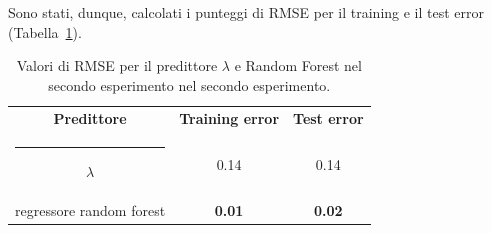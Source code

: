 \documentclass[12pt]{report}
\makeatletter
\theoremstyle{definition}
\newcommand{\thickhline}{%
    \noalign {\ifnum 0=`}\fi \hrule height 1pt
    \futurelet \reserved@a \@xhline
}
\makeatother
\begin{document}
Sono stati, dunque, calcolati i punteggi di RMSE per il training e il test error (Tabella~\ref{rmse_exp2}). 
\begin{table}
\centering
\begin{adjustbox}{max width=\textwidth}
 \begin{tabular}{|c|c|c|} 
 \hline
\textbf{Predittore} & \textbf{Training error} & \textbf{Test error}
\\ [0.5ex] 
 \thickhline
 $\lambda$ & 0.14 & 0.14 \\
 regressore random forest & \textbf{0.01} & \textbf{0.02}
 \\
 \hline
\end{tabular}
\end{adjustbox}
\caption{Valori di RMSE per il predittore $\lambda$ e Random Forest nel secondo esperimento nel secondo esperimento.}
\label{rmse_exp2}
\end{table}
\end{document}
